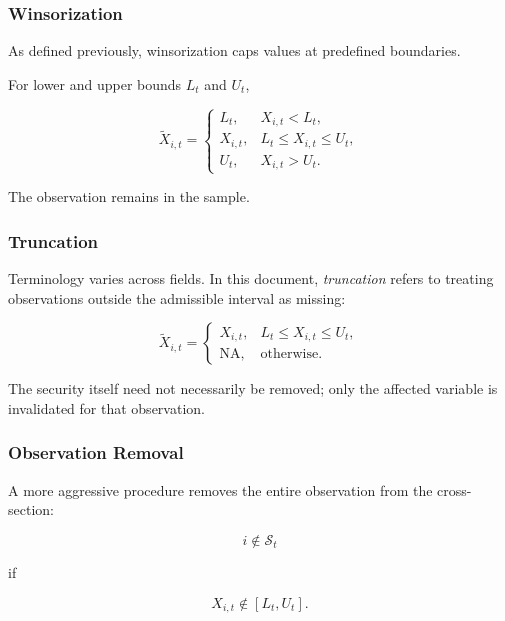 \documentclass[11pt,a4paper]{article}
\begin{document}
\subsubsection{Winsorization}

As defined previously, winsorization caps values at predefined boundaries.

For lower and upper bounds $L_t$ and $U_t$,

\begin{equation}
\boxed{
\widetilde{X}_{i,t}
=
\begin{cases}
L_t,
&
X_{i,t}<L_t,
\\
X_{i,t},
&
L_t\leq X_{i,t}\leq U_t,
\\
U_t,
&
X_{i,t}>U_t.
\end{cases}
}
\end{equation}

The observation remains in the sample.


\subsubsection{Truncation}

Terminology varies across fields. In this document, \emph{truncation} refers to
treating observations outside the admissible interval as missing:

\begin{equation}
\boxed{
\widetilde{X}_{i,t}
=
\begin{cases}
X_{i,t},
&
L_t\leq X_{i,t}\leq U_t,
\\
\mathrm{NA},
&
\text{otherwise}.
\end{cases}
}
\end{equation}

The security itself need not necessarily be removed; only the affected variable
is invalidated for that observation.


\subsubsection{Observation Removal}

A more aggressive procedure removes the entire observation from the
cross-section:

\begin{equation}
i
\notin
\mathcal{S}_t
\end{equation}

if

\begin{equation}
X_{i,t}
\notin
[L_t,U_t].
\end{equation}
\end{document}
